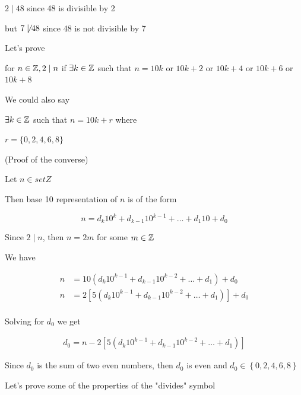 \documentclass[../../Main.tex]{subfiles}
\begin{document}
\begin{example}
    
    $2 \mid 48$ since 48 is divisible by 2

    but $7 \not \mid 48$ since 48 is not divisible by 7

    Let's prove

    \begin{center}
        for $n \in \mathbb{Z}, 2 \mid n$ if $\exists k \in \mathbb{Z}$ such that $n = 10k$ or $10k + 2$ or $10k + 4$ or $10k + 6$ or $10k + 8$
        
        We could also say

        $\exists k \in \mathbb{Z}$ such that $n = 10k + r$ where

        $r = \{0, 2, 4, 6, 8\}$
    \end{center}

    \begin{poof}
        (Proof of the converse)

        Let $n \in setZ$

        Then base 10 representation of $n$ is of the form

        $$n = d_k 10^k + d_{k - 1} 10^{k - 1} + \ldots + d_1 10 + d_0$$

        Since $2 \mid n$, then $n = 2m$ for some $m \in \mathbb{Z}$

        We have 

        \begin{align*}
            n &= 10(d_k 10^ {k - 1} + d_{k - 1} 10^{k - 2} + \ldots + d_1) + d_0 \\
            n &= 2\left[5 \left(d_k 10^ {k - 1} + d_{k - 1} 10^{k - 2} + \ldots + d_1\right)\right] + d_0 \\
        \end{align*}

        Solving for $d_0$ we get

        \begin{align*}
            d_0 = n - 2\left[5 \left(d_k 10^ {k - 1} + d_{k - 1} 10^{k - 2} + \ldots + d_1\right)\right]
        \end{align*}

        Since $d_0$ is the sum of two even numbers, then $d_0$ is even and $d_0 \in \left\{0, 2, 4, 6, 8\right\}$

    \end{poof}
\end{example}

Let's prove some of the properties of the "divides" symbol
\end{document}
